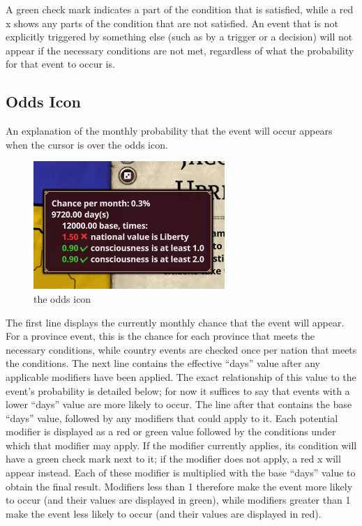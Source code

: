 A green check mark indicates a part of the condition that is satisfied, while a red x shows any parts of the condition that are not satisfied. An event that is not explicitly triggered by something else (such as by a trigger or a decision) will not appear if the necessary conditions are not met, regardless of what the probability for that event to occur is.

\subsection{Odds Icon}
An explanation of the monthly probability that the event will occur appears when the cursor is over the odds icon.

\begin{figure}[htb]
\begin{center}
	\includegraphics{province_odds.png}
\end{center}
\caption{the odds icon}
\end{figure}

The first line displays the currently monthly chance that the event will appear. For a province event, this is the chance for each province that meets the necessary conditions, while country events are checked once per nation that meets the conditions. The next line contains the effective ``days'' value after any applicable modifiers have been applied. The exact relationship of this value to the event's probability is detailed below; for now it suffices to say that events with a lower ``days'' value are more likely to occur. The line after that contains the base ``days'' value, followed by any modifiers that could apply to it. Each potential modifier is displayed as a red or green value followed by the conditions under which that modifier may apply. If the modifier currently applies, its condition will have a green check mark next to it; if the modifier does not apply, a red x will appear instead. Each of these modifier is multiplied with the base ``days'' value to obtain the final result. Modifiers less than 1 therefore make the event more likely to occur (and their values are displayed in green), while modifiers greater than 1 make the event less likely to occur (and their values are displayed in red).

